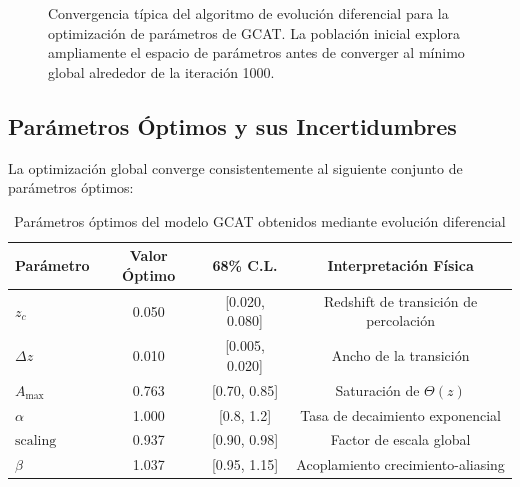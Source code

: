 \documentclass[12pt, a4paper]{article}
\theoremstyle{plain}
\theoremstyle{definition}
\begin{document}
\begin{figure}[h]
\centering
{}
\caption{Convergencia típica del algoritmo de evolución diferencial para la optimización de parámetros de GCAT. La población inicial explora ampliamente el espacio de parámetros antes de converger al mínimo global alrededor de la iteración 1000.}
\label{fig:de_convergence}
\end{figure}

\subsection{Parámetros Óptimos y sus Incertidumbres}

La optimización global converge consistentemente al siguiente conjunto de parámetros óptimos:

\begin{table}[h]
\centering
\caption{Parámetros óptimos del modelo GCAT obtenidos mediante evolución diferencial}
\label{tab:optimal_parameters}
\begin{tabular}{lccc}
\toprule
\textbf{Parámetro} & \textbf{Valor Óptimo} & \textbf{68\% C.L.} & \textbf{Interpretación Física} \\
\midrule
$z_c$ & 0.050 & [0.020, 0.080] & Redshift de transición de percolación \\
$\Delta z$ & 0.010 & [0.005, 0.020] & Ancho de la transición \\
$A_{\max}$ & 0.763 & [0.70, 0.85] & Saturación de $\Theta(z)$ \\
$\alpha$ & 1.000 & [0.8, 1.2] & Tasa de decaimiento exponencial \\
$\text{scaling}$ & 0.937 & [0.90, 0.98] & Factor de escala global \\
$\beta$ & 1.037 & [0.95, 1.15] & Acoplamiento crecimiento-aliasing \\
\bottomrule
\end{tabular}
\end{table}
\end{document}
